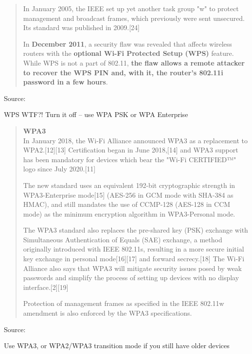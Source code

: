 \documentclass[Screen16to9,17pt]{foils}
\begin{document}

\begin{quote}
In January 2005, the IEEE set up yet another task group "w" to protect management and broadcast frames, which previously were sent unsecured. Its standard was published in 2009.[24]

In {\bf December 2011}, a security flaw was revealed that affects wireless routers with the {\bf optional Wi-Fi Protected Setup (WPS)} feature. While WPS is not a part of 802.11, {\bf the flaw allows a remote attacker to recover the WPS PIN and, with it, the router's 802.11i password in a few hours}.
\end{quote}
Source: 

\vskip 1cm
\centerline{WPS WTF?! Turn it off -- use WPA PSK or WPA Enterprise}




\begin{quote}\small
{\bf WPA3}\\
In January 2018, the Wi-Fi Alliance announced WPA3 as a replacement to WPA2.[12][13] Certification began in June 2018,[14] and WPA3 support has been mandatory for devices which bear the "Wi-Fi CERTIFIED™" logo since July 2020.[11]

The new standard uses an equivalent 192-bit cryptographic strength in WPA3-Enterprise mode[15] (AES-256 in GCM mode with SHA-384 as HMAC), and still mandates the use of CCMP-128 (AES-128 in CCM mode) as the minimum encryption algorithm in WPA3-Personal mode.

The WPA3 standard also replaces the pre-shared key (PSK) exchange with Simultaneous Authentication of Equals (SAE) exchange, a method originally introduced with IEEE 802.11s, resulting in a more secure initial key exchange in personal mode[16][17] and forward secrecy.[18] The Wi-Fi Alliance also says that WPA3 will mitigate security issues posed by weak passwords and simplify the process of setting up devices with no display interface.[2][19]

Protection of management frames as specified in the IEEE 802.11w amendment is also enforced by the WPA3 specifications.
\end{quote}
Source: 

\begin{list2}
\item Use WPA3, or WPA2/WPA3 transition mode if you still have older devices
\end{list2}
\end{document}
